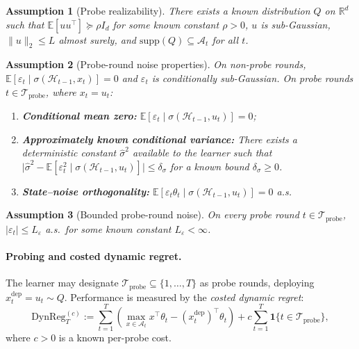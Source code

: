 \documentclass{article}
\newcommand{\R}{\mathbb{R}}
\newcommand{\E}{\mathbb{E}}
\newcommand{\cA}{\mathcal{A}}
\newcommand{\cH}{\mathcal{H}}
\newcommand{\cTprobe}{\mathcal{T}_{\mathrm{probe}}}
\newcommand{\DynReg}{\mathrm{DynReg}}
\newcommand{\supp}{\mathrm{supp}}
\newtheorem{assumption}{Assumption}
\begin{document}
\begin{assumption}[Probe realizability]
\label{assum:probe_realizability}
There exists a known distribution $Q$ on $\R^d$ such that
$\E[uu^\top] \succeq \rho I_d$ for some known constant $\rho>0$,
$u$ is sub-Gaussian,
$\|u\|_2 \le L$ almost surely,
and $\supp(Q)\subseteq \cA_t$ for all $t$.
\end{assumption}

\begin{assumption}[Probe-round noise properties]
\label{assum:probe_noise}
On non-probe rounds, $\E[\varepsilon_t \mid \sigma(\cH_{t-1},x_t)] = 0$ and $\varepsilon_t$ is conditionally sub-Gaussian.
On probe rounds $t\in \cTprobe$, where $x_t=u_t$:
\begin{enumerate}[label=(\roman*)]
    \item \textbf{Conditional mean zero:} $\E[\varepsilon_t \mid \sigma(\cH_{t-1},u_t)] = 0$;
    \item  \textbf{Approximately known conditional variance:} There exists a deterministic constant $\hat\sigma^2$ available to the learner such that
$\bigl|\hat\sigma^2 - \E[\varepsilon_t^2 \mid \sigma(\cH_{t-1}, u_t)]\bigr| \le \delta_\sigma$ for a known bound $\delta_\sigma \ge 0$.
    \item \textbf{State--noise orthogonality:}
    $\E[\varepsilon_t \theta_t \mid \sigma(\cH_{t-1},u_t)] = 0$ a.s.
\end{enumerate}
\end{assumption}

\begin{assumption}[Bounded probe-round noise]
  \label{assum:bounded_probe_noise}
  On every probe round $t \in \cTprobe$,
  $|\varepsilon_t| \le L_\varepsilon$ a.s.\
  for some known constant $L_\varepsilon < \infty$.
\end{assumption}

\paragraph{Probing and costed dynamic regret.}
The learner may designate $\cTprobe \subseteq \{1, \ldots, T\}$ as probe rounds, deploying $x_t^{\mathrm{dep}} = u_t \sim Q$.
Performance is measured by the \emph{costed dynamic regret}:
\begin{equation}
  \DynReg_T^{(c)} := \sum_{t=1}^T \left(\max_{x \in \cA_t} x^\top \theta_t - (x_t^{\mathrm{dep}})^\top \theta_t\right) + c \sum_{t=1}^T \mathbf{1}\{t \in \cTprobe\},
  \label{eq:costed_regret}
\end{equation}
where $c > 0$ is a known per-probe cost.
\end{document}
